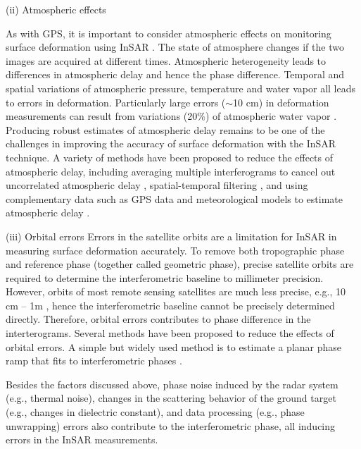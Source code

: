 (ii) Atmospheric effects 

As with GPS, it is important to consider atmospheric effects on monitoring surface deformation using InSAR \cite[]{goldstein1995chpt2,zebker1997chpt2}. The state of atmosphere changes if the two images are acquired at different times.  Atmospheric heterogeneity leads to differences in atmospheric delay and hence the phase difference. Temporal and spatial variations of atmospheric pressure, temperature and water vapor all leads to errors in deformation.  Particularly large errors ($\sim$10 cm) in deformation measurements can result from variations (20\%) of atmospheric water vapor \cite[]{zebker1997chpt2}.  Producing robust estimates of atmospheric delay remains to be one of the challenges in improving the accuracy of surface deformation with the InSAR technique.  A variety of methods have been proposed to reduce the effects of atmospheric delay, including averaging multiple interferograms to cancel out uncorrelated atmospheric delay \cite[e.g.,][]{zebker1997chpt2}, spatial-temporal filtering \cite[e.g.,][]{berardino2002chpt2}, and using complementary data such as GPS data and meteorological models to estimate atmospheric delay \cite[e.g.,][]{williams1998chpt2,foster2006chpt2,jolivet2014chpt2}.

(iii) Orbital errors
Errors in the satellite orbits are a limitation for InSAR in measuring surface deformation accurately.  To remove both tropographic phase and reference phase (together called geometric phase), precise satellite orbits are required to determine the interferometric baseline to millimeter precision.  However, orbits of most remote sensing satellites are much less precise, e.g., 10 cm – 1m \cite[]{yoon2009chpt2,eineder2011chpt2,rudenko2012chpt2}, hence the interferometric baseline cannot be precisely determined directly. Therefore, orbital errors contributes to phase difference in the interterograms.  Several methods have been proposed to reduce the effects of orbital errors.  A simple but widely used method is to estimate a planar phase ramp that fits to interferometric phases \cite[]{massonnet1998chpt2}. 

Besides the factors discussed above, phase noise induced by the radar system (e.g., thermal noise), changes in the scattering behavior of the ground target (e.g., changes in dielectric constant), and data processing (e.g., phase unwrapping) errors also contribute to the interferometric phase, all inducing errors in the InSAR measurements.  

